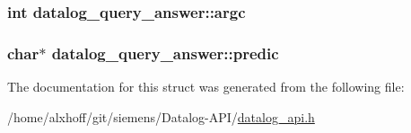 \subsubsection[{\texorpdfstring{argc}{argc}}]{\setlength{\rightskip}{0pt plus 5cm}int datalog\+\_\+query\+\_\+answer\+::argc}\hypertarget{structdatalog__query__answer_a29951460bcc8f936f7f349c851ba3819}{}\label{structdatalog__query__answer_a29951460bcc8f936f7f349c851ba3819}
\subsubsection[{\texorpdfstring{predic}{predic}}]{\setlength{\rightskip}{0pt plus 5cm}char$\ast$ datalog\+\_\+query\+\_\+answer\+::predic}\hypertarget{structdatalog__query__answer_a721776aabf590192c96df972333d38d4}{}\label{structdatalog__query__answer_a721776aabf590192c96df972333d38d4}


The documentation for this struct was generated from the following file\+:\begin{DoxyCompactItemize}
\item 
/home/alxhoff/git/siemens/\+Datalog-\/\+A\+P\+I/\hyperlink{datalog__api_8h}{datalog\+\_\+api.\+h}\end{DoxyCompactItemize}
